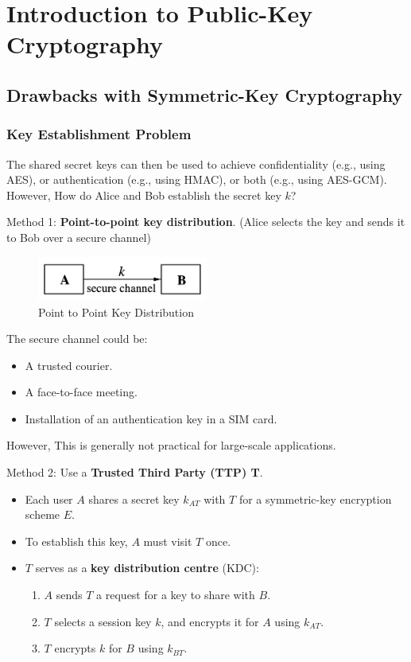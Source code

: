 \documentclass[12pt,titlepage]{article}
\let\stdsection\section
\renewcommand\section{\clearpage\stdsection}
\begin{document}
\section{Introduction to Public-Key Cryptography}
\subsection{Drawbacks with Symmetric-Key Cryptography}
\subsubsection{Key Establishment Problem}

The shared secret keys can then be used to achieve confidentiality (e.g., using AES), or authentication (e.g., using HMAC), or both (e.g., using AES-GCM). However, How do Alice and Bob establish the secret key $k$?

Method 1: \textbf{Point-to-point key distribution}. (Alice selects the key and sends it to Bob over a secure channel) 

\begin{center}
	\begin{figure}[h!]
		\centering
		\includegraphics[width=0.5\textwidth]{Point_to_Point_Key_Distribution.png}
		\caption{Point to Point Key Distribution}
	\end{figure}
\end{center}

The secure channel could be: \begin{itemize}
	\item A trusted courier.
	\item A face-to-face meeting.
	\item Installation of an authentication key in a SIM card.
\end{itemize}
However, This is generally not practical for large-scale applications.

Method 2: Use a \textbf{Trusted Third Party (TTP) T}.
\begin{itemize}
	\item Each user $A$ shares a secret key $k_{AT}$ with $T$ for a symmetric-key encryption scheme $E$.
	\item To establish this key, $A$ must visit $T$ once.
	\item $T$ serves as a \textbf{key distribution centre} (KDC): \begin{enumerate}
		\item $A$ sends $T$ a request for a key to share with $B$.
		\item $T$ selects a session key $k$, and encrypts it for $A$ using $k_{AT}$.
		\item $T$ encrypts $k$ for $B$ using $k_{BT}$.
	\end{enumerate}
\end{itemize}
\end{document}

